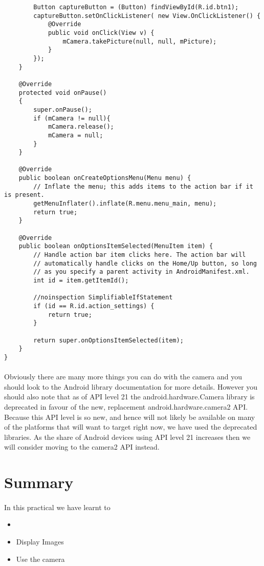 \begin{lstlisting}
        Button captureButton = (Button) findViewById(R.id.btn1);
        captureButton.setOnClickListener( new View.OnClickListener() {
            @Override
            public void onClick(View v) {
                mCamera.takePicture(null, null, mPicture);
            }
        });
    }

    @Override
    protected void onPause()
    {
        super.onPause();
        if (mCamera != null){
            mCamera.release();
            mCamera = null;
        }
    }

    @Override
    public boolean onCreateOptionsMenu(Menu menu) {
        // Inflate the menu; this adds items to the action bar if it is present.
        getMenuInflater().inflate(R.menu.menu_main, menu);
        return true;
    }

    @Override
    public boolean onOptionsItemSelected(MenuItem item) {
        // Handle action bar item clicks here. The action bar will
        // automatically handle clicks on the Home/Up button, so long
        // as you specify a parent activity in AndroidManifest.xml.
        int id = item.getItemId();

        //noinspection SimplifiableIfStatement
        if (id == R.id.action_settings) {
            return true;
        }

        return super.onOptionsItemSelected(item);
    }
}
\end{lstlisting}

\paragraph{} Obviously there are many more things you can do with the camera and you should look to the Android library documentation for more details. However you should also note that as of API level 21 the android.hardware.Camera library is deprecated in favour of the new, replacement android.hardware.camera2 API. Because this API level is so new, and hence will not likely be available on many of the platforms that will want to target right now, we have used the deprecated libraries. As the share of Android devices using API level 21 increases then we will consider moving to the camera2 API instead.



\section{Summary}
\paragraph{} In this practical we have learnt to

\begin{itemize}
\item \item Display Images
\item Use the camera
\end{itemize}


